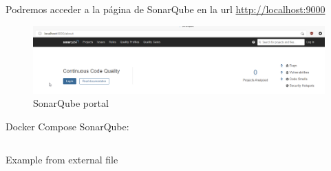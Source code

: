 Podremos acceder a la página de SonarQube en la url \href{http://localhost:9000}{http://localhost:9000}
\begin{figure}[h!]  
    \includegraphics[width=\linewidth]{./imagenes/06_SonarQubeServer_Webpage.png}
    \caption{SonarQube portal}  
    \label{fig:6}
\end{figure}
Docker Compose SonarQube:
\begin{listing}[ht]
    \inputminted{yaml}{./EntornoPruebas/SonarQube_8.2/docker-compose.yml}
    \caption{Example from external file}
    \label{listing:3}
  \end{listing}
